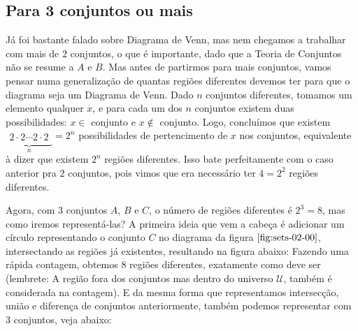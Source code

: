   \subsection{Para 3 conjuntos ou mais}
  Já foi bastante falado sobre Diagrama de Venn, mas nem chegamos a trabalhar com mais de $2$ conjuntos, o que é importante, dado que a Teoria de Conjuntos não se resume a $A$ e $B$. Mas antes de partirmos para mais conjuntos, vamos pensar numa generalização de quantas regiões diferentes devemos ter para que o diagrama seja um Diagrama de Venn. Dado $n$ conjuntos diferentes, tomamos um elemento qualquer $x$, e para cada um dos $n$ conjuntos existem duas possibilidades: $x \in $ conjunto e $x \notin $ conjunto. Logo, concluímos que existem $\underbrace{\begin{matrix} 2\cdot2\cdots2\cdot2\end{matrix}}_{n} = 2^n$ possibilidades de pertencimento de $x$ nos conjuntos, equivalente à dizer que existem $2^n$ regiões diferentes. Isso bate perfeitamente com o caso anterior pra $2$ conjuntos, pois vimos que era necessário ter $4=2^2$ regiões diferentes.

  Agora, com $3$ conjuntos $A$, $B$ e $C$, o número de regiões diferentes é $2^3=8$, mas como iremos representá-las? A primeira ideia que vem a cabeça é adicionar um círculo representando o conjunto $C$ no diagrama da figura $\ref{fig:sets-02-00}$, intersectando as regiões já existentes, resultando na figura abaixo:
  Fazendo uma rápida contagem, obtemos $8$ regiões diferentes, exatamente como deve ser (lembrete: A região fora dos conjuntos mas dentro do universo $\mathcal U$, também é considerada na contagem). E da mesma forma que representamos intersecção, união e diferença de conjuntos anteriormente, também podemos representar com $3$ conjuntos, veja abaixo:



